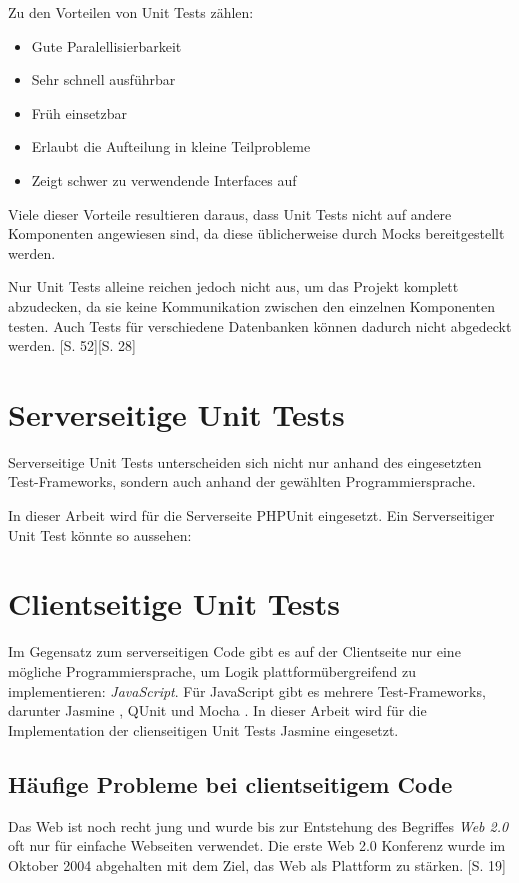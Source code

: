 \documentclass[a4paper,bibtotoc,oneside]{scrbook}
\begin{document}
Zu den Vorteilen von Unit Tests zählen:

\begin{itemize}
	\item Gute Paralellisierbarkeit
	\item Sehr schnell ausführbar
	\item Früh einsetzbar
	\item Erlaubt die Aufteilung in kleine Teilprobleme
	\item Zeigt schwer zu verwendende Interfaces auf
\end{itemize}

Viele dieser Vorteile resultieren daraus, dass Unit Tests nicht auf andere Komponenten angewiesen sind, da diese üblicherweise durch Mocks bereitgestellt werden. 

Nur Unit Tests alleine reichen jedoch nicht aus, um das Projekt komplett abzudecken, da sie keine Kommunikation zwischen den einzelnen Komponenten testen. Auch Tests für verschiedene Datenbanken können dadurch nicht abgedeckt werden. \cite{test_large_systems}[S. 52]\cite{betrieb}[S. 28]

\section{Serverseitige Unit Tests}
Serverseitige Unit Tests unterscheiden sich nicht nur anhand des eingesetzten Test-Frameworks, sondern auch anhand der gewählten Programmiersprache. 

In dieser Arbeit wird für die Serverseite PHPUnit eingesetzt. Ein  Serverseitiger Unit Test könnte so aussehen:





\section{Clientseitige Unit Tests}
Im Gegensatz zum serverseitigen Code gibt es auf der Clientseite nur eine mögliche Programmiersprache, um Logik plattformübergreifend zu implementieren: \emph{JavaScript}. Für JavaScript gibt es mehrere Test-Frameworks, darunter Jasmine \cite{jasmine}, QUnit \cite{qunit} und Mocha \cite{mocha}.
In dieser Arbeit wird für die Implementation der clienseitigen Unit Tests Jasmine eingesetzt.

\subsection{Häufige Probleme bei clientseitigem Code}
Das Web ist noch recht jung und wurde bis zur Entstehung des Begriffes \emph{Web 2.0} oft nur für einfache Webseiten verwendet. Die erste Web 2.0 Konferenz wurde im Oktober 2004 abgehalten mit dem Ziel, das Web als Plattform zu stärken. \cite{web2}[S. 19]
\end{document}
